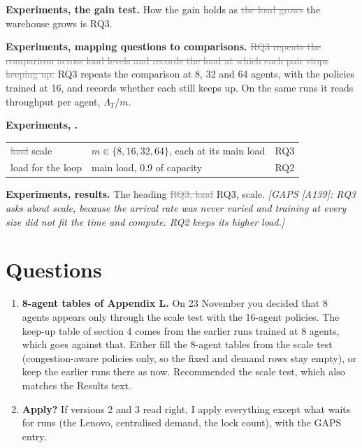 \documentclass[11pt,a4paper]{article}
\newcommand{\new}[1]{\textcolor{newc}{#1}}
\newcommand{\old}[1]{\textcolor{gray}{\sout{#1}}}
\newcommand{\note}[1]{{\small\itshape [#1]}}
\newcommand{\lab}[1]{\textsf{\footnotesize\detokenize{#1}}}
\begin{document}
\textbf{Experiments, the gain test.} How the gain holds as
\old{the load grows} \new{the warehouse grows} is RQ3.

\textbf{Experiments, mapping questions to comparisons.}
\old{RQ3 repeats the comparison across load levels and records the load at
which each pair stops keeping up.}
\new{RQ3 repeats the comparison at 8, 32 and 64 agents, with the policies
trained at 16, and records whether each still keeps up.}
On the same runs it reads throughput per agent, $\Lambda_T / m$.

\textbf{Experiments, \lab{tab:expfactors}.}

\begin{tabular}{lll}
  \toprule
  \old{load} \new{scale} & $m \in \{8, 16, 32, 64\}$, each at its main load & RQ3 \\
  load for the loop & main load, 0.9 of capacity & RQ2 \\
  \bottomrule
\end{tabular}

\textbf{Experiments, results.} The heading \old{RQ3, load} \new{RQ3, scale}.
\note{GAPS [A139]: RQ3 asks about scale, because the arrival rate was never
varied and training at every size did not fit the time and compute. RQ2 keeps
its higher load.}

\section*{Questions}
\begin{enumerate}
  \item \textbf{8-agent tables of Appendix L.} On 23 November you decided that
    8 agents appears only through the scale test with the 16-agent policies.
    The keep-up table of section 4 comes from the earlier runs trained at 8
    agents, which goes against that. Either fill the 8-agent tables from the
    scale test (congestion-aware policies only, so the fixed and demand rows
    stay empty), or keep the earlier runs there as now. Recommended the
    scale test, which also matches the Results text.
  \item \textbf{Apply?} If versions 2 and 3 read right, I apply everything
    except what waits for runs (the Lenovo, centralised demand, the lock
    count), with the GAPS entry.
\end{enumerate}
\end{document}
